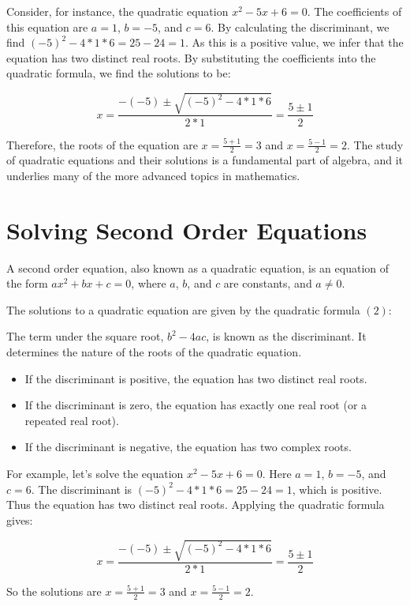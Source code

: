 \documentclass[12pt]{book}
\begin{document}
Consider, for instance, the quadratic equation $x^2 - 5x + 6 = 0$. The coefficients of this equation are $a=1$, $b=-5$, and $c=6$. By calculating the discriminant, we find $(-5)^2 - 4*1*6 = 25 - 24 = 1$. As this is a positive value, we infer that the equation has two distinct real roots. By substituting the coefficients into the quadratic formula, we find the solutions to be:

\[x = \frac{-(-5) \pm \sqrt{(-5)^2 - 4*1*6}}{2*1} = \frac{5 \pm 1}{2}\]

Therefore, the roots of the equation are $x = \frac{5 + 1}{2} = 3$ and $x = \frac{5 - 1}{2} = 2$. The study of quadratic equations and their solutions is a fundamental part of algebra, and it underlies many of the more advanced topics in mathematics.
\section{Solving Second Order Equations}

A second order equation, also known as a quadratic equation, is an equation of the form $ax^2 + bx + c = 0$, where $a$, $b$, and $c$ are constants, and $a \neq 0$. 

The solutions to a quadratic equation are given by the quadratic formula $(2)$:

The term under the square root, $b^2 - 4ac$, is known as the discriminant. It determines the nature of the roots of the quadratic equation.

\begin{itemize}
    \item If the discriminant is positive, the equation has two distinct real roots.
    \item If the discriminant is zero, the equation has exactly one real root (or a repeated real root).
    \item If the discriminant is negative, the equation has two complex roots.
\end{itemize}

For example, let's solve the equation $x^2 - 5x + 6 = 0$. Here $a=1$, $b=-5$, and $c=6$. The discriminant is $(-5)^2 - 4*1*6 = 25 - 24 = 1$, which is positive. Thus the equation has two distinct real roots. Applying the quadratic formula gives:

\[x = \frac{-(-5) \pm \sqrt{(-5)^2 - 4*1*6}}{2*1} = \frac{5 \pm 1}{2}\]

So the solutions are $x = \frac{5 + 1}{2} = 3$ and $x = \frac{5 - 1}{2} = 2$.

\newpage
\end{document}
